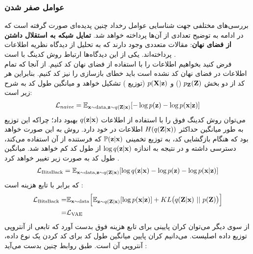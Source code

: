 \subsubsection{عوامل صفر شدن }
بررسی‌های مختلفی جهت شناسایی عوامل رخداد چنین پدیده‌ای صورت گرفته است که در ادامه به توضیح تعدادی از آن‌ها پرداخته خواهد شد.
\vspace{.3cm}
\newline
\textbf{تمایل شبکه \decoder{}
	به استقلال داشتن از فضای نهان}: 
مقالات متعددی وجود دارند که به تحلیل \vae{} از دیدگاه نظریه اطلاعات پرداخته‌اند. یکی از این دیدگاه‌ها ارتباط روش کدینگ \bitsback{} با \vae{} است \cite{vae_lossy}.\\
فرض کنید بخواهیم اطلاعات را با استفاده از فضای نهان \vae{} کد کنیم. از آنجا که تمام اطلاعات در فضای نهان کد نشده است باید خطای بازسازی را نیز کد کنیم. بنابراین هر کد از دو بخش
$p_{\bf Z}({\bf Z})$
(\priordist{})
و $p({\bf X}|{\bf z})$
(توزیع \decoder{})
تشکیل خواهد و میانگین طول کد به شرح زیر است:
\begin{gather}
	\mathcal{L}_{naive} = \mathbb E_{{\bf x} \sim \text{data}, {\bf z} \sim q({\bf Z}|{\bf x})} [-\log p({\bf z}) - \log p({\bf x}|{\bf z})]
\end{gather}
می‌توان روش کدینگ فوق را با استفاده از اطلاعات $q({\bf z}|{\bf x})$ بهبود داد؛ چراکه این توزیع به طور میانگین حداکثر $H(q({\bf Z}|{\bf x}))$ اطلاعات در خود دارد. روش به این صورت خواهد بود که \decoder{} هنگام بازگشایی کد، به توزیع تخمینی $\mathbb P({\bf z}|{\bf x})$ که فرستنده از آن استفاده می‌کند، دسترسی داشته و در نتیجه به اندازه $\log q({\bf z}|{\bf x})$ از طول کد کم خواهد شد. میانگین طول کد به صورت زیر تغییر خواهد کرد \cite{vae_lossy}.
\begin{gather}
	\mathcal{L}_{\text{BitsBack}} = \mathbb E_{{\bf x} \sim \text{data}, {\bf z} \sim q({\bf Z}|{\bf x})} [\log q({\bf z}|{\bf x}) -\log p({\bf z}) - \log p({\bf x}|{\bf z})]
\end{gather}
که برابر با تابع هزینه \vae{} است \cite{vae_lossy}:
\begin{gather}
	\begin{align}
		\mathcal{L}_{\text{BitsBack}} = & \mathbb E_{{\bf x} \sim \text{data}} \Big[\mathbb E_{{\bf z} \sim q({\bf Z}|{\bf x})} [\log p({\bf x}|{\bf z})] + KL\big(q({\bf Z}|{\bf x}) ~||~ p({\bf Z})\big)\Big] \nonumber
		\\
		=                               & \mathcal{L}_{\text{VAE}}
	\end{align}
\end{gather}
از سوی دیگر می‌توان کران پایینی برای تابع هزینه فوق بدست آورد که تابعی از آنتروپی توزیع داده اصلیست. می‌دانیم کران پایین میانگین طول کد برای کد کردن یک نوع داده، آنتروپی آن است. طبق روابط چنین بدست می‌آید \cite{vae_lossy}:
